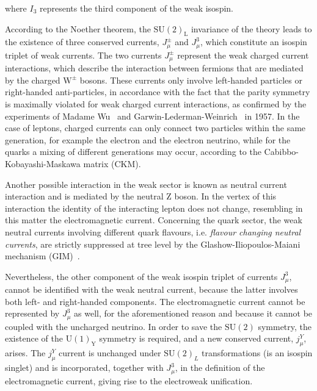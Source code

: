\noindent where $I_3$ represents the third component of the weak isospin. 

According to the Noether theorem, the $\mathrm{SU(2)_L}$ invariance of the theory leads to the existence of three conserved currents, $J_\mu^\pm$ and $J_\mu^3$, which constitute an isospin triplet of weak currents. 
The two currents $J_\mu^\pm$ represent the weak charged current interactions, which describe the interaction between fermions that are mediated by the charged $\mathrm{W^\pm}$ bosons. These currents only involve left-handed particles or right-handed anti-particles, in accordance with the fact that the parity symmetry is maximally violated for weak charged current interactions, as confirmed by the experiments of Madame Wu~\cite{Wu:1957my} and Garwin-Lederman-Weinrich~\cite{Garwin:1957hc} in 1957. In the case of leptons, charged currents can only connect two particles within the same generation, for example the electron and the electron neutrino, while for the quarks a mixing of different generations may occur, according to the Cabibbo-Kobayashi-Maskawa matrix (CKM).

Another possible interaction in the weak sector is known as neutral current interaction and is mediated by the neutral Z boson. In the vertex of this interaction the identity of the interacting lepton does not change, resembling in this matter the electromagnetic current. Concerning the quark sector, the weak neutral currents involving different quark flavours, i.e. \emph{flavour changing neutral currents}, are strictly suppressed at tree level by the Glashow-Iliopoulos-Maiani mechanism (GIM)~\cite{Glashow:1970gm}.

Nevertheless, the other component of the weak isospin triplet of currents $J_\mu^3$, cannot be identified with the weak neutral current, because the latter involves both left- and right-handed components. The electromagnetic current cannot be represented by $J_\mu^3$ as well, for the aforementioned reason and because it cannot be coupled with the uncharged neutrino. In order to save the $\mathrm{SU(2)}$ symmetry, the existence of the $\mathrm{U(1)_Y}$ symmetry is required, and a new conserved current, $j_\mu^Y$, arises. The $j_\mu^Y$ current is unchanged under $\mathrm{SU(2)}_L$ transformations (is an isospin singlet) and is incorporated, together with $J_\mu^3$, in the definition of the electromagnetic current, giving rise to the electroweak unification.


